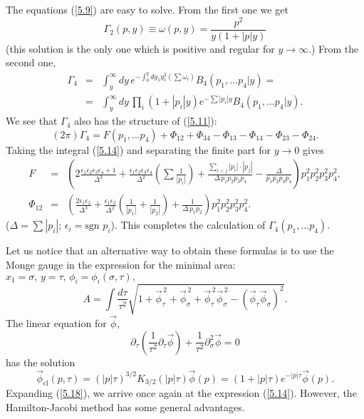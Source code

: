 \documentclass[a4paper,12pt]{article}
\numberwithin{equation}{section}
\begin{document}
The equations (\ref{5.9}) are easy to solve. From the first one we get
\begin{equation}
\label{5.13}
\Gamma _{2}(p,y)\equiv \omega (p,y)=\frac{p^{2}}{y(1+|p|y)}
\end{equation}
 (this solution is the only one which is positive and regular for \( y\to \infty  \).)
From the second one,
\begin{eqnarray}
\Gamma _{4} & = & \int _{y}^{\infty }dy\, e^{-\int _{0}^{y}dy_{1}y_{1}^{2}\left( \sum \omega _{i}\right) }B_{4}(p_{1},\ldots p_{4}|y)=\nonumber \\
 & = & \int _{y}^{\infty }dy\, \prod _{i}(1+|p_{i}|y)e^{-\sum |p_{i}|y}B_{4}(p_{1},\ldots p_{4}|y).\label{5.14} 
\end{eqnarray}
 We see that \( \Gamma _{4} \) also has the structure of (\ref{5.11}):
\begin{equation}
\label{5.15}
(2\pi )\Gamma _{4}=F(p_{1},\ldots p_{4})+\Phi _{12}+\Phi _{34}-\Phi _{13}-\Phi _{14}-\Phi _{23}-\Phi _{24}.
\end{equation}
 Taking the integral (\ref{5.14}) and separating the finite part for \( y\to 0 \)
gives
\begin{eqnarray}
F & = & \left( 2\frac{\epsilon _{1}\epsilon _{2}\epsilon _{3}\epsilon _{4}+1}{\Delta ^{3}}+\frac{\epsilon _{1}\epsilon _{2}\epsilon _{3}\epsilon _{4}}{\Delta ^{2}}\left( \sum \frac{1}{|p_{i}|}\right) +\frac{\sum _{i<j}|p_{i}|\cdot |p_{j}|}{\Delta \, p_{1}p_{2}p_{3}p_{4}}-\frac{\Delta }{p_{1}p_{2}p_{3}p_{4}}\right) p_{1}^{2}p_{2}^{2}p_{3}^{2}p_{4}^{2},\nonumber \\
\Phi _{12}\! \! \! \!  & = & \left( \frac{2\epsilon _{1}\epsilon _{2}}{\Delta ^{3}}+\frac{\epsilon _{1}\epsilon _{2}}{\Delta ^{2}}\left( \frac{1}{|p_{1}|}+\frac{1}{|p_{2}|}\right) +\frac{1}{\Delta \, p_{1}p_{2}}\right) p_{1}^{2}p_{2}^{2}p_{3}^{2}p_{4}^{2}.\label{5.17} 
\end{eqnarray}
 (\( \Delta =\sum |p_{i}| \); \( \epsilon _{i}=\textrm{sgn }p_{i} \)). This
completes the calculation of \( \Gamma _{4}(p_{1},\ldots p_{4}) \). 

Let us notice that an alternative way to obtain these formulas is to use the
Monge gauge in the expression for the minimal area: \( x_{1}=\sigma ,\, y=\tau ,\, \phi _{i}=\phi _{i}(\sigma ,\tau ), \)
\begin{equation}
\label{5.18}
A=\int \frac{d\tau }{\tau ^{2}}\sqrt{{1+\vec{\phi }_{\tau }^{\, 2}+\vec{\phi }_{\sigma }^{\, 2}+\vec{\phi }_{\tau }^{\, 2}\vec{\phi }_{\sigma }^{\, 2}-\left( \vec{\phi }_{\tau }\vec{\phi }_{\sigma }\right) ^{2}}}.
\end{equation}
 The linear equation for \( \vec{\phi } \),
\[
\partial _{\tau }\left( \frac{1}{\tau ^{2}}\partial _{\tau }\vec{\phi }\right) +\frac{1}{\tau ^{2}}\partial _{\sigma }^{2}\vec{\phi }=0\]
 has the solution
\[
\vec{\phi }_{\textrm{cl}}(p,\tau )=(|p|\tau )^{3/2}K_{3/2}(|p|\tau )\vec{\phi }(p)=(1+|p|\tau )e^{-|p|\tau }\vec{\phi }(p).\]
Expanding (\ref{5.18}), we arrive once again at the expression (\ref{5.14}).
However, the Hamilton-Jacobi method has some general advantages.
\end{document}
